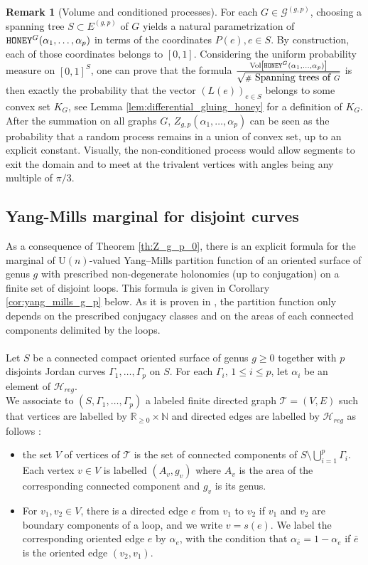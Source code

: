 \documentclass[11pt,a4paper]{amsart}
\providecommand{\U}{\mathrm U}
\providecommand{\Vol}{\operatorname{Vol}}
\providecommand{\honey}{\texttt{\textsc{HONEY}}}
\numberwithin{equation}{section}
\theoremstyle{definition}
\newtheorem{remark}[theorem]{Remark}
\begin{document}
\begin{remark}[Volume and conditioned processes]\label{rmk:_volume_conditioned_process}
For each $G\in\mathcal{G}^{(g,p)}$, choosing a spanning tree $S\subset E^{(g,p)}$ of $G$ yields a natural parametrization of $\honey^G(\alpha_1,\ldots,\alpha_p)$ in terms of  the coordinates $P(e),e\in S$. By construction, each of those coordinates belongs to $[0,1]$. Considering the uniform probability measure on $[0,1]^S$, one can prove that the formula $\frac{\Vol \left[ \honey^G(\alpha_1, 
        \dots, \alpha_p) \right]}{\sqrt{\# \mbox{ Spanning trees of } G}}$ is then exactly the probability that the vector $(L(e))_{e\in S}$ belongs to some convex set $K_G$, see Lemma \ref{lem:differential_gluing_honey} for a definition of $K_G$. After the summation on all graphs $G$, $Z_{g, p}(\alpha_1,\ldots,\alpha_p)$ can be seen as the probability that a random process remains in a union of convex set, up to an explicit constant. Visually, the non-conditioned process would allow segments to exit the domain and to meet at the trivalent vertices with angles being any multiple of $\pi/3$. 
\end{remark}
\subsection{Yang-Mills marginal for disjoint curves}\label{subsec:Yang-mills_result}
As a consequence of Theorem \ref{th:Z_g_p_0}, there is an explicit formula 
for the marginal of $\U(n)$-valued Yang--Mills partition function of an
oriented surface 
of genus $g$ with prescribed non-degenerate holonomies 
(up to conjugation) on a finite set of disjoint loops. This 
formula is given in Corollary \ref{cor:yang_mills_g_p} below.
As it is proven in \cite{levy2003yang}, the partition function 
only depends on the prescribed conjugacy classes and on the 
areas of each connected components delimited by the loops. 
\\
\\
Let $S$ be a connected compact oriented surface of genus $g \geqslant 0$
together with $p$ disjoints Jordan curves 
$\Gamma_1,\ldots,\Gamma_p$ on $S$. For each 
$\Gamma_i, \,1\leqslant i\leqslant p$, let $\alpha_i$ be an element of 
$\mathcal{H}_{reg}$.
\\
We associate to $(S,\Gamma_1,\ldots,\Gamma_p)$ a labeled finite directed graph $\mathcal{T}=(V,E)$ such that vertices are labelled by $\mathbb{R}_{\geqslant 0} \times \mathbb{N}$ and directed edges are labelled by $\mathcal{H}_{reg}$ as follows :
\begin{itemize}
\item the set $V$ of vertices of $\mathcal{T}$ is the set of connected components of $S\setminus \bigcup_{i=1}^p\Gamma_i$. 
Each vertex $v\in V$ is labelled $(A_v,g_v)$ where $A_v$ is the area of the corresponding connected component and $g_v$ is its genus.
\item For $v_1,v_2\in V$, there is a directed edge $e$ from $v_1$ to $v_2$ 
if $v_1$ and $v_2$ are boundary components of a loop, and we write $v=s(e)$. We label the corresponding oriented edge $e$ by $\alpha_e$, with the condition that $\alpha_{\bar{e}}=1-\alpha_e$ if $\bar{e}$ is the oriented edge $(v_2,v_1)$.
\end{itemize}
\end{document}
